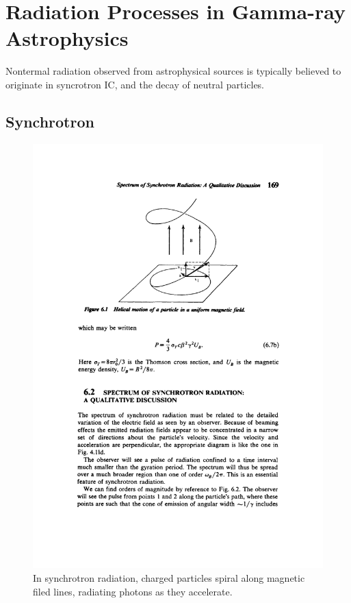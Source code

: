 \section{Radiation Processes in Gamma-ray Astrophysics}

Nontermal radiation observed from astrophysical sources
is typically believed to originate in syncrotron
\ac{IC}, and the decay of neutral \pion particles.

\subsection{Synchrotron}


\begin{figure}[htbp]
  \centering 
    \includegraphics{chapters/introduction/figures/syncrotron_radiation_spiral.pdf}
    \caption{In synchrotron radiation, charged particles spiral along
      magnetic filed lines, radiating photons as they accelerate.}
\end{figure}


